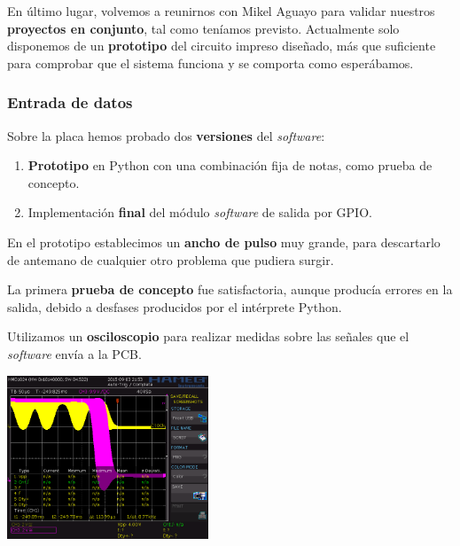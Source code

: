 \documentclass[10pt,a4paper]{article}
\begin{document}
	En último lugar, volvemos a reunirnos con Mikel Aguayo para validar nuestros \textbf{proyectos en conjunto}, tal como teníamos previsto. Actualmente solo disponemos de un \textbf{prototipo} del circuito impreso diseñado, más que suficiente para comprobar que el sistema funciona y se comporta como esperábamos.
	
	\subsubsection*{Entrada de datos}
	
	Sobre la placa hemos probado dos \textbf{versiones} del \textit{software}:
	
	\begin{enumerate}
		\item \textbf{Prototipo} en Python con una combinación fija de notas, como prueba de concepto.
		\item Implementación \textbf{final} del módulo \textit{software} de salida por GPIO.
	\end{enumerate}
	
	\clearpage
	
	\begin{multicols}{2}
		En el prototipo establecimos un \textbf{ancho de pulso} muy grande, para descartarlo de antemano de cualquier otro problema que pudiera surgir. 
		
		La primera \textbf{prueba de concepto} fue satisfactoria, aunque producía errores en la salida, debido a desfases producidos por el intérprete Python.
		
		Utilizamos un \textbf{osciloscopio} para realizar medidas sobre las señales que el \textit{software} envía a la PCB.
		\columnbreak
		\noindent
		\begin{center}
			\includegraphics[width=0.45\textwidth]{images/osc_pulso} 
		\end{center}
		
	\end{multicols}
	
\end{document}
